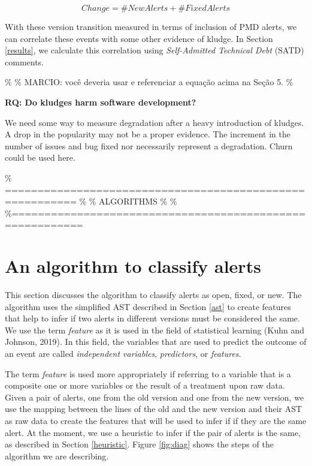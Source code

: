 \documentclass[
]{article}
\begin{document}
\[Change = \#NewAlerts + \#FixedAlerts\]

With these version transition measured in terms of inclusion of PMD
alerts, we can correlate these events with some other evidence of
kludge. In Section \ref{results}, we calculate this correlation using
\textit{Self-Admitted Technical Debt} (SATD) comments.

\% \% MARCIO: você deveria usar e referenciar a equação acima na Seção
5. \%

\vspace{16px}

\noindent \textbf{RQ: Do kludges harm software development?}
\label{kludge_harm}

We need some way to measure degradation after a heavy introduction of
kludges. A drop in the popularity may not be a proper evidence. The
increment in the number of issues and bug fixed nor necessarily
represent a degradation. Churn could be used here.

\% ========================================================= \% \%
ALGORITHMS \% \%
\%=========================================================

\section{An algorithm to classify alerts}
\label{alg}

This section discusses the algorithm to classify alerts as open, fixed,
or new. The algorithm uses the simplified AST described in Section
\ref{ast} to create features that help to infer if two alerts in
different versions must be considered the same. We use the term
\textit{feature} as it is used in the field of statistical learning
(Kuhn and Johnson, 2019). In this field, the variables that are used to
predict the outcome of an event are called \emph{independent variables},
\emph{predictors}, or \emph{features}.

The term \emph{feature} is used more appropriately if referring to a
variable that is a composite one or more variables or the result of a
treatment upon raw data. Given a pair of alerts, one from the old
version and one from the new version, we use the mapping between the
lines of the old and the new version and their AST as raw data to create
the features that will be used to infer if if they are the same alert.
At the moment, we use a heuristic to infer if the pair of alerts is the
same, as described in Section \ref{heuristic}. Figure \ref{fig:diag}
shows the steps of the algorithm we are describing.
\end{document}
